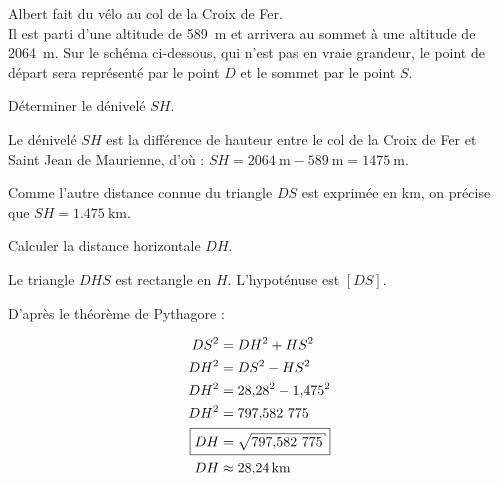 \documentclass[../Cours.tex]{subfiles}
\begin{document}
\begin{questions}
Albert fait du vélo au col de la Croix de Fer.\\
Il est parti d'une altitude de \qty{589}{\metre} et arrivera au sommet à une altitude de \qty{2064}{\metre}.
Sur le schéma ci-dessous, qui n'est pas en vraie grandeur, le point de départ sera représenté par le point $D$ et le sommet par le point $S$.

\begin{center}
\end{center}

\question Déterminer le dénivelé $SH$.

{\color{rouge}
    Le dénivelé $SH$ est la différence de hauteur entre le col de la Croix de Fer et Saint Jean de Maurienne, d'où : $SH = \qty{2064}{\metre} - \qty{589}{\metre} = \qty{1475}{\metre}$.

    Comme l'autre distance connue du triangle $DS$ est exprimée en \unit{km}, on précise que $SH = \qty{1.475}{\kilo\metre}$.
}

\question Calculer la distance horizontale $DH$.

{\color{rouge}
    Le triangle $DHS$ est rectangle en $H$. L'hypoténuse est $[DS]$.

    D'après le théorème de Pythagore : 

    \begin{align*}
        DS^2 &= DH^2 + HS^2 \\
        DH^2 &= DS^2 - HS^2 \\
        DH^2 &= \num{28.28}^2 - \num{1.475}^2 \\
        DH^2 &= \num{797.582775} \\ 
        \Aboxed{DH &= \sqrt{\num{797.582775}}} \\ 
        DH &\approx \qty{28.24}{\kilo\metre}
    \end{align*}
}



\end{questions}
\end{document}
